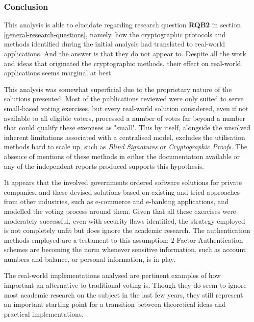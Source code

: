 \documentclass[../access.tex]{subfiles}
\begin{document}
    \subsubsection{Conclusion}
    This analysis is able to elucidate regarding research question \textbf{RQB2} in section \ref{general-research-questions}, namely, how the cryptographic protocols and methods identified during the initial analysis had translated to real-world applications. And the answer is that they do not appear to. Despite all the work and ideas that originated the cryptographic methods, their effect on real-world applications seems marginal at best.
    \par
    This analysis was somewhat superficial due to the proprietary nature of the solutions presented. Most of the publications reviewed were only suited to serve small-based voting exercises, but every real-world solution considered, even if not available to all eligible voters, processed a number of votes far beyond a number that could qualify these exercises as "small". This by itself, alongside the unsolved inherent limitations associated with a centralised model, excludes the utilisation methods hard to scale up, such as \textit{Blind Signatures} or \textit{Cryptographic Proofs}. The absence of mentions of these methods in either the documentation available or any of the independent reports produced supports this hypothesis.
    \par
    It appears that the involved governments ordered software solutions for private companies, and these devised solutions based on existing and tried approaches from other industries, such as e-commerce and e-banking applications, and modelled the voting process around them. Given that all these exercises were moderately successful, even with security flaws identified, the strategy employed is not completely unfit but does ignore the academic research. The authentication methods employed are a testament to this assumption: 2-Factor Authentication schemes are becoming the norm whenever sensitive information, such as account numbers and balance, or personal information, is in play.
    \par
    The real-world implementations analysed are pertinent examples of how important an alternative to traditional voting is. Though they do seem to ignore most academic research on the subject in the last few years, they still represent an important starting point for a transition between theoretical ideas and practical implementations.
    \twocolumn
\end{document}
